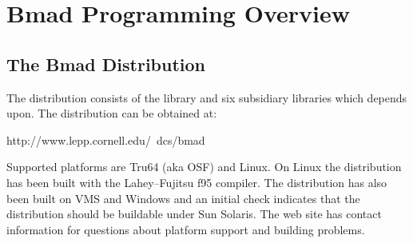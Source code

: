 \chapter{Bmad Programming Overview}
\label{c:programming}

\section {The Bmad Distribution}
\label{s:libs}

The \bmad distribution consists of the \bmad library and six subsidiary
libraries which \bmad depends upon. The \bmad distribution can be obtained at:
\begin{example}
    http://www.lepp.cornell.edu/~dcs/bmad
\end{example}
Supported platforms are Tru64 (aka OSF) and Linux. On Linux the \bmad
distribution has been built with the Lahey--Fujitsu f95 compiler. The
\bmad distribution has also been built on VMS and Windows and an
initial check indicates that the distribution should be buildable
under Sun Solaris. The \bmad web site has contact information for
questions about platform support and building problems.

